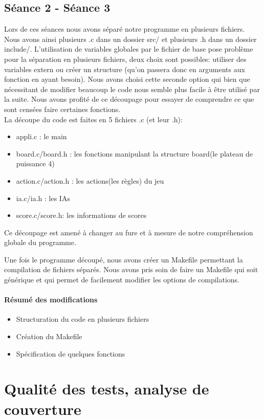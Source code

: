 \documentclass{article}
\begin{document}
\subsection{Séance 2 - Séance 3}

Lors de ces séances nous avons séparé notre programme en plusieurs fichiers. Nous avons ainsi plusieurs .c dans un dossier src/ et plusieurs .h dans un dossier include/. L'utilisation de variables globales par le fichier de base pose problème pour la séparation en plusieurs fichiers, deux choix sont possibles: utiliser des variables extern ou créer un structure (qu'on passera donc en arguments aux fonction en ayant besoin). Nous avons choisi cette seconde option qui bien que nécessitant de modifier beaucoup le code nous semble plus facile à être utilisé par la suite. Nous avons profité de ce découpage pour essayer de comprendre ce que sont censées faire certaines fonctions.\\
La découpe du code est faites en 5 fichiers .c (et leur .h):
\begin{itemize}
\item appli.c : le main
\item board.c/board.h : les fonctions manipulant la structure board(le plateau de puissance 4)
\item action.c/action.h : les actions(les règles) du jeu
\item ia.c/ia.h : les IAs
\item score.c/score.h: les informations de scores
\end{itemize}
Ce découpage est amené à changer au fure et à mesure de notre compréhension globale du programme.

Une fois le programme découpé, nous avons créer un Makefile permettant la compilation de fichiers séparés. Nous avons pris soin de faire un Makefile qui soit générique et qui permet de facilement modifier les options de compilations.

\paragraph{Résumé des modifications}
\begin{itemize}
\item Structuration du code en plusieurs fichiers
\item Création du Makefile
\item Spécification de quelques fonctions
\end{itemize}


\section{Qualité des tests, analyse de couverture}
\end{document}
